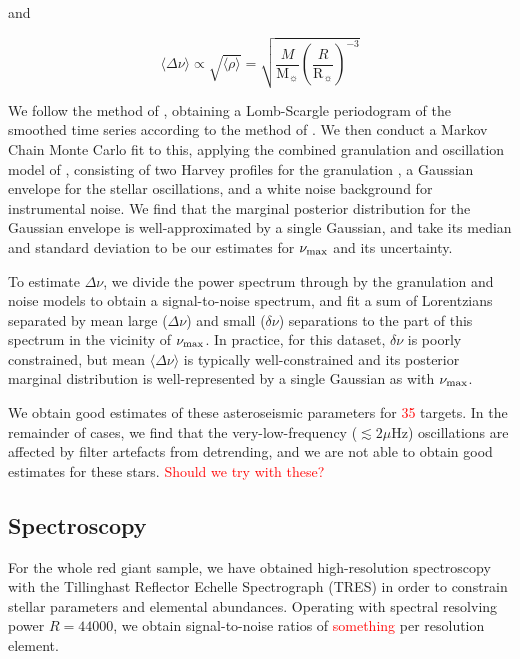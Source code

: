 \documentclass[a4paper,fleqn,usenatbib]{mnras}
\newcommand{\numax}{\mbox{$\nu_{\rm max}$}\xspace}
\newcommand{\Dnu}{\mbox{$\Delta \nu$}\xspace}
\newcommand{\dnu}{\mbox{$\delta \nu$}\xspace}
\newcommand{\muHz}{\mbox{$\mu$Hz}\xspace}
\newcommand{\msun}{\mbox{$\mathrm{M}_{\sun}$}\xspace}
\newcommand{\rsun}{\mbox{$\mathrm{R}_{\sun}$}\xspace}
\begin{document}
and

\begin{equation}
\langle \Dnu \rangle \propto \sqrt{\langle \rho \rangle} = \sqrt{\dfrac{M}{\msun} (\dfrac{R}{\rsun})^{-3}}
\end{equation}

We follow the method of \citet{2016AN....337..774D}, obtaining a Lomb-Scargle periodogram of the smoothed time series according to the method of \citet{2011MNRAS.414L...6G}. We then conduct a Markov Chain Monte Carlo fit to this, applying the combined granulation and oscillation model of \citet{2014A&A...570A..41K}, consisting of two Harvey profiles for the granulation \citep{1985ESASP.235..199H}, a Gaussian envelope for the stellar oscillations, and a white noise background for instrumental noise. We find that the marginal posterior distribution for the Gaussian envelope is well-approximated by a single Gaussian, and take its median and standard deviation to be our estimates for \numax and its uncertainty.

To estimate \Dnu, we divide the power spectrum through by the granulation and noise models to obtain a signal-to-noise spectrum, and fit a sum of Lorentzians separated by mean large (\Dnu) and small (\dnu) separations to the part of this spectrum in the vicinity of \numax. In practice, for this dataset, \dnu is poorly constrained, but mean $\langle \Dnu \rangle$ is typically well-constrained and its posterior marginal distribution is well-represented by a single Gaussian as with \numax. 

We obtain good estimates of these asteroseismic parameters for \textcolor{red}{35} targets. In the remainder of cases, we find that the very-low-frequency ($\lesssim 2\muHz$) oscillations are affected by filter artefacts from detrending, and we are not able to obtain good estimates for these stars. \textcolor{red}{Should we try with these?}

\subsection{Spectroscopy}
\label{spectroscopy}

For the whole red giant sample, we have obtained high-resolution spectroscopy with the Tillinghast Reflector Echelle Spectrograph (TRES) in order to constrain stellar parameters and elemental abundances. Operating with spectral resolving power $R=44 000$, we obtain signal-to-noise ratios of \textcolor{red}{something} per resolution element. 
\end{document}
